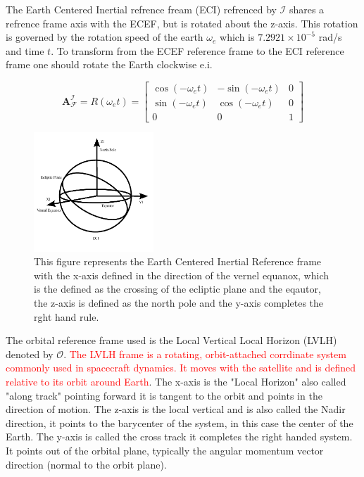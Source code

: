 
The Earth Centered Inertial refrence fream (ECI) refrenced by $\mathcal{I}$ shares a refrence frame axis with the ECEF, but is rotated about the z-axis. This rotation is governed
by the rotation speed of the earth $\omega_e$ which is $7.2921\times10^{-5}$ rad/s and time $t$. To transform from the ECEF reference frame to the ECI reference frame one should
rotate the Earth clockwise e.i. 

\begin{equation}
    \mathbf{A}_{\mathcal{F}}^{\mathcal{I}} = R(\omega_e t) = 
    \begin{bmatrix}
        \cos(-\omega_e t) & -\sin(-\omega_e t) & 0\\
        \sin(-\omega_e t) & \cos(-\omega_e t) & 0\\
        0 & 0 & 1
    \end{bmatrix}
\end{equation}

\begin{figure}[H]
    \centering
    \includegraphics[width=0.4\textwidth]{figures/modelling/ECI.pdf}
    \caption{This figure represents the Earth Centered Inertial Reference frame with the x-axis defined in the direction of the vernel equanox, which is the defined as the crossing
    of the ecliptic plane and the eqautor, the z-axis is defined as the north pole and the y-axis completes the rght hand rule.}
    \label{fig:ECIRF}
\end{figure}


The orbital reference frame used is the Local Vertical Local Horizon (LVLH) denoted by $\mathcal{O}$. \textcolor{red}{The LVLH frame is a rotating, orbit-attached corrdinate
system commonly used in spacecraft dynamics. It moves with the satellite and is defined relative to its orbit around Earth}. The x-axis is the "Local Horizon" also called
"along track" pointing forward it is tangent to the orbit and points in the direction of motion. The z-axis is the local vertical and is also called the Nadir direction, it points
to the barycenter of the system, in this case the center of the Earth. The y-axis is called the cross track it completes the right handed system. It points out of the orbital plane,
typically the angular momentum vector direction (normal to the orbit plane).

